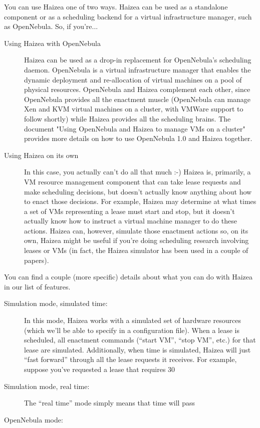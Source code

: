 You can use Haizea one of two ways. Haizea can be used as a standalone component or as a scheduling backend for a virtual infrastructure manager, such as OpenNebula. So, if you're...

\begin{description}
\item[Using Haizea with OpenNebula] Haizea can be used as a drop-in replacement for OpenNebula's scheduling daemon. OpenNebula is a virtual infrastructure manager that enables the dynamic deployment and re-allocation of virtual machines on a pool of physical resources. OpenNebula and Haizea complement each other, since OpenNebula provides all the enactment muscle (OpenNebula can manage Xen and KVM virtual machines on a cluster, with VMWare support to follow shortly) while Haizea provides all the scheduling brains. The document "Using OpenNebula and Haizea to manage VMs on a cluster" provides more details on how to use OpenNebula 1.0 and Haizea together.
\item[Using Haizea on its own] In this case, you actually can't do all that much :-) Haizea is, primarily, a VM resource management component that can take lease requests and make scheduling decisions, but doesn't actually know anything about how to enact those decisions. For example, Haizea may determine at what times a set of VMs representing a lease must start and stop, but it doesn't actually know how to instruct a virtual machine manager to do these actions. Haizea can, however, simulate those enactment actions so, on its own, Haizea might be useful if you're doing scheduling research involving leases or VMs (in fact, the Haizea simulator has been used in a couple of papers).
\end{description}

You can find a couple (more specific) details about what you can do with Haizea in our list of features.

\begin{description}
 \item[Simulation mode, simulated time:] In this mode, Haizea works with a simulated set of hardware resources (which we'll be able to specify in a configuration file). When a lease is scheduled, all enactment commands (``start VM'', ``stop VM'', etc.) for that lease are simulated. Additionally, when time is simulated, Haizea will just ``fast forward'' through all the lease requests it receives. For example, suppose you've requested a lease that requires 30
 \item[Simulation mode, real time:]  The ``real time'' mode simply means that time will pass
 \item[OpenNebula mode:] 
\end{description}


